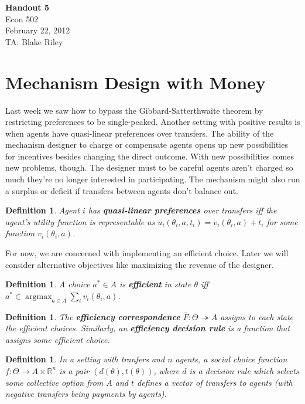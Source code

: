 \documentclass[letter, 10pt]{article}
\newtheorem{definition}[theorem]{Definition}
\theoremstyle{definition}
\newcommand{\R}{\mathbb{R}}
\newcommand{\tto}{\twoheadrightarrow}
\begin{document}
\begin{spacing}{1.1}

\noindent
\textbf{Handout 5} \\
Econ 502 \\
February 22, 2012 \\
TA: Blake Riley \\

\section{Mechanism Design with Money}
\label{sec:vick-clarke-grov}

Last week we saw how to bypass the Gibbard-Satterthwaite theorem by
restricting preferences to be single-peaked. Another setting with positive
results is when agents have quasi-linear preferences over transfers. The
ability of the mechanism designer to charge or compensate agents opens up
new possibilities for incentives besides changing the direct outcome. With
new possibilities comes new problems, though. The designer must to be
careful agents aren't charged so much they're no longer interested in
participating. The mechanism might also run a surplus or deficit if
transfers between agents don't balance out.

\begin{definition}
  Agent $i$ has \textbf{quasi-linear preferences} over transfers iff the
  agent's utility function is representable as $u_i(\theta_i, a, t_i) =
  v_i(\theta_i,a)+t_i$ for some function $v_i(\theta_i,a)$.
\end{definition}

For now, we are concerned with implementing an efficient choice. Later we
will consider alternative objectives like maximizing the revenue of the
designer.

\begin{definition}
  A choice $a^* \in A$ is \textbf{efficient} in state $\theta$ iff $a^* \in
  \operatorname{argmax}_{a\in A} \sum_i v_i(\theta_i, a)$.
\end{definition}

\begin{definition}
  The \textbf{efficiency correspondence} $\bar{F}:\Theta \tto A$ assigns to
  each state the efficient choices. Similarly, an \textbf{efficiency
    decision rule} is a function that assigns some efficient choice.
\end{definition}

\begin{definition}
  In a setting with tranfers and $n$ agents, a social choice function
  $f:\Theta \to A\times \R^n$ is a pair $(d(\theta), t(\theta))$, where $d$
  is a decision rule which selects some collective option from $A$ and $t$
  defines a vector of transfers to agents (with negative transfers being
  payments by agents).
\end{definition}


\end{spacing}
\end{document}

